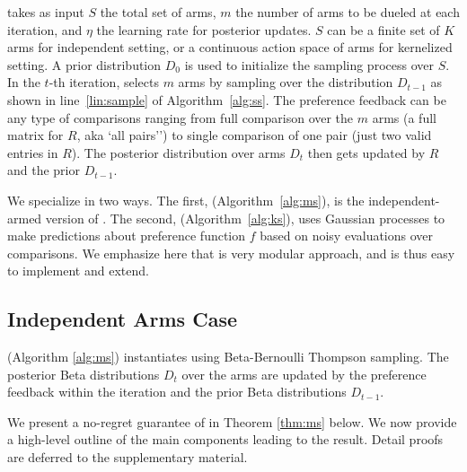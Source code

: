 \selfsparring takes as input $S$ the total set of arms, $m$ the number of arms to be dueled at each iteration, and $\eta$ the learning rate for posterior updates. $S$ can be a finite set of $K$ arms for independent setting, or a  continuous action space of arms for kernelized setting. A prior distribution $D_0$ is used to initialize the sampling process over $S$. In the $t$-th iteration, \selfsparring selects $m$ arms by  sampling over the distribution $D_{t-1}$ as shown in line~\ref{lin:sample} of Algorithm~\ref{alg:ss}. The preference feedback can be any type of comparisons ranging from full comparison over the $m$ arms (a full matrix for $R$, aka `all pairs'') to single comparison of one pair (just two valid entries in $R$). The posterior distribution over arms $D_t$ then gets updated by $R$ and the prior $D_{t-1}$.

We specialize \selfsparring in two ways.  The first, \multisparring (Algorithm~\ref{alg:ms}), is the independent-armed version of \selfsparring.  The second,  \kersparring (Algorithm~\ref{alg:ks}), uses Gaussian processes to make predictions about preference function $f$ based on noisy evaluations over comparisons. We emphasize here that \selfsparring is very modular approach, and is thus easy to implement and extend.

\subsection{Independent Arms Case}
\label{sec:multisparring}
\multisparring (Algorithm \ref{alg:ms}) instantiates \selfsparring using Beta-Bernoulli Thompson sampling.  
The posterior Beta distributions  $D_t$ over the arms are updated by the preference feedback within the iteration and the prior Beta distributions $D_{t-1}$.

We present a no-regret guarantee of \multisparring in Theorem \ref{thm:ms} below.  We now provide a high-level outline of the main components leading to the result.  Detail proofs are deferred to the supplementary material.

